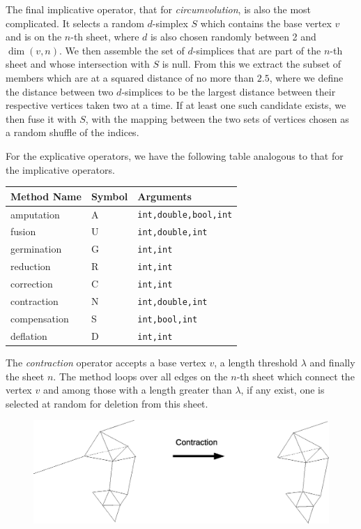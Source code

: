 \documentclass[12pt,letterpaper]{report}
\begin{document}
The final implicative operator, that for \emph{circumvolution}, is also the most complicated. It selects a random 
$d$-simplex $S$ which contains the base vertex $v$ and is on the $n$-th sheet, where $d$ is also chosen randomly between 
2 and $\dim(v,n)$. We then assemble the set of $d$-simplices that are part of the $n$-th sheet and whose intersection 
with $S$ is null. From this we extract the subset of members which are at a squared distance of no more than $2.5$, 
where we define the distance between two $d$-simplices to be the largest distance between their respective vertices 
taken two at a time. If at least one such candidate exists, we then fuse it with $S$, with the mapping between the two 
sets of vertices chosen as a random shuffle of the indices.  

For the explicative operators, we have the following table analogous to that for the implicative operators.
\begin{center}
\begin{tabular}{|l|l|l|}
\hline
Method Name & Symbol & Arguments \\
\hline \hline
amputation & A & \texttt{{int,double,bool,int}} \\
fusion & U & \texttt{{int,double,int}} \\
germination & G & \texttt{{int,int}} \\
reduction & R & \texttt{{int,int}} \\
correction & C & \texttt{{int,int}} \\
contraction & N & \texttt{{int,double,int}} \\
compensation & S & \texttt{{int,bool,int}} \\
deflation & D & \texttt{{int,int}} \\
\hline
\end{tabular}
\end{center}
The \emph{contraction} operator accepts a base vertex $v$, a length threshold $\lambda$ and finally the sheet 
$n$. The method loops over all edges on the $n$-th sheet which connect the vertex $v$ and among those with a 
length greater than $\lambda$, if any exist, one is selected at random for deletion from this sheet.
\begin{figure}[ht]
\centering
\includegraphics[width=5in]{images/contraction.eps}
\label{contraction}
\end{figure}
\end{document}
